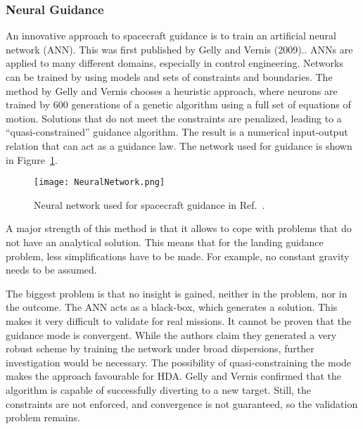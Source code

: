 \documentclass[%
]{aiaa-tc}
\begin{document}
\subsubsection{Neural Guidance}

\noindent An innovative approach to spacecraft guidance is to train an
artificial neural network (ANN). This was first published by Gelly and Vernis
(2009).\cite{Gelly2009}. ANNs are applied to many different domains, especially
in control engineering.\cite{Haykin1998} Networks can be trained by using models
and sets of constraints and boundaries. The method by Gelly and Vernis chooses a
heuristic approach, where neurons are trained by \num{600} generations of a
genetic algorithm using a full set of equations of motion. Solutions that do not
meet the constraints are penalized, leading to a ``quasi-constrained'' guidance
algorithm. The result is a numerical input-output relation that can act as a
guidance law. The network used for guidance is shown in
Figure~\ref{fig:neuralnetwork}.

\begin{figure}
	\centering
	\texttt{[image: NeuralNetwork.png]}
	\caption{Neural network used for spacecraft guidance in
        Ref.~.}\label{fig:neuralnetwork}
\end{figure}

A major strength of this method is that it allows to cope with problems that do
not have an analytical solution. This means that for the landing guidance
problem, less simplifications have to be made. For example, no constant gravity
needs to be assumed. 

The biggest problem is that no insight is gained, neither in the problem, nor in
the outcome. The ANN acts as a black-box, which generates a solution.  This
makes it very difficult to validate for real missions. It cannot be proven that
the guidance mode is convergent.  While the authors claim they generated a very
robust scheme by training the network under broad dispersions, further
investigation would be necessary. The possibility of quasi-constraining the mode
makes the approach favourable for HDA. Gelly and Vernis confirmed that the
algorithm is capable of successfully diverting to a new target. Still, the
constraints are not enforced, and convergence is not guaranteed, so the
validation problem remains.
\end{document}
